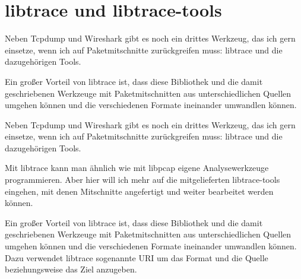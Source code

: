 \section{libtrace und libtrace-tools}
\label{sec:netz-werkzeuge-librace}
\begin{abstractsec}
  Neben Tcpdump und Wireshark gibt es noch ein drittes Werkzeug, das ich gern
  einsetze, wenn ich auf Paketmitschnitte zurückgreifen muss: libtrace und die
  dazugehörigen Tools.

  Ein großer Vorteil von libtrace ist, dass diese Bibliothek und die damit
  geschriebenen Werkzeuge mit Paketmitschnitten aus unterschiedlichen Quellen
  umgehen können und die verschiedenen Formate ineinander umwandlen können.
\end{abstractsec}
\begin{normaltext}
  Neben Tcpdump und Wireshark gibt es noch ein drittes Werkzeug, das ich gern
  einsetze, wenn ich auf Paketmitschnitte zurückgreifen muss: libtrace und die
  dazugehörigen Tools.

  Mit libtrace kann man ähnlich wie mit libpcap eigene Analysewerkzeuge
  programmieren. Aber hier will ich mehr auf die mitgelieferten libtrace-tools
  eingehen, mit denen Mitschnitte angefertigt und weiter bearbeitet werden
  können.

  Ein großer Vorteil von libtrace ist, dass diese Bibliothek und die damit
  geschriebenen Werkzeuge mit Paketmitschnitten aus unterschiedlichen Quellen
  umgehen können und die verschiedenen Formate ineinander umwandlen können.
  Dazu verwendet libtrace sogenannte URI um das Format und die Quelle
  beziehungsweise das Ziel anzugeben.


\end{normaltext}
